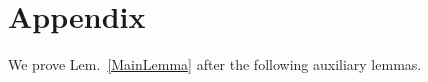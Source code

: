 \documentclass[journal, twocolumn]{IEEEtran}
\newtheorem{lemma}{Lemma}
\begin{document}









\section{Appendix}\label{proofs}

We prove Lem.~\ref{MainLemma} after the following auxiliary lemmas.  %


\end{document}
